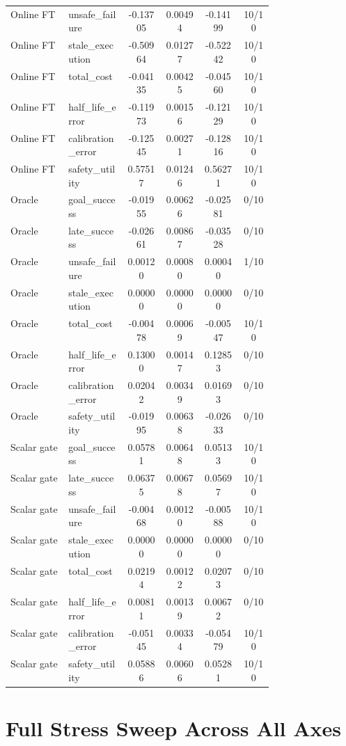 \documentclass{article}
\begin{document}
\begin{center}
\begin{longtable}{p{0.22\linewidth}p{0.22\linewidth}cccc}
Online FT & unsafe\_failure & -0.13705 & 0.00494 & -0.14199 & 10/10\\
Online FT & stale\_execution & -0.50964 & 0.01277 & -0.52242 & 10/10\\
Online FT & total\_cost & -0.04135 & 0.00425 & -0.04560 & 10/10\\
Online FT & half\_life\_error & -0.11973 & 0.00156 & -0.12129 & 10/10\\
Online FT & calibration\_error & -0.12545 & 0.00271 & -0.12816 & 10/10\\
Online FT & safety\_utility & 0.57517 & 0.01246 & 0.56271 & 10/10\\
Oracle & goal\_success & -0.01955 & 0.00626 & -0.02581 & 0/10\\
Oracle & late\_success & -0.02661 & 0.00867 & -0.03528 & 0/10\\
Oracle & unsafe\_failure & 0.00120 & 0.00080 & 0.00040 & 1/10\\
Oracle & stale\_execution & 0.00000 & 0.00000 & 0.00000 & 0/10\\
Oracle & total\_cost & -0.00478 & 0.00069 & -0.00547 & 10/10\\
Oracle & half\_life\_error & 0.13000 & 0.00147 & 0.12853 & 0/10\\
Oracle & calibration\_error & 0.02042 & 0.00349 & 0.01693 & 0/10\\
Oracle & safety\_utility & -0.01995 & 0.00638 & -0.02633 & 0/10\\
Scalar gate & goal\_success & 0.05781 & 0.00648 & 0.05133 & 10/10\\
Scalar gate & late\_success & 0.06375 & 0.00678 & 0.05697 & 10/10\\
Scalar gate & unsafe\_failure & -0.00468 & 0.00120 & -0.00588 & 10/10\\
Scalar gate & stale\_execution & 0.00000 & 0.00000 & 0.00000 & 0/10\\
Scalar gate & total\_cost & 0.02194 & 0.00122 & 0.02073 & 0/10\\
Scalar gate & half\_life\_error & 0.00811 & 0.00139 & 0.00672 & 0/10\\
Scalar gate & calibration\_error & -0.05145 & 0.00334 & -0.05479 & 10/10\\
Scalar gate & safety\_utility & 0.05886 & 0.00606 & 0.05281 & 10/10\\
\bottomrule
\end{longtable}
\normalsize
\end{center}

\section{Full Stress Sweep Across All Axes}
\end{document}
